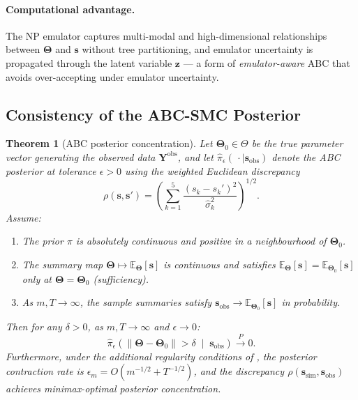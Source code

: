 \documentclass[12pt,a4paper]{article}
\newtheorem{theorem}{Theorem}
\theoremstyle{definition}
\newcommand{\E}{\mathbb{E}}
\newcommand{\bz}{\bm{z}}
\newcommand{\bs}{\bm{s}}
\newcommand{\bTheta}{\bm{\Theta}}
\begin{document}
\paragraph{Computational advantage.}  The NP emulator captures multi-modal
and high-dimensional relationships between $\bTheta$ and $\bs$ without tree
partitioning, and emulator uncertainty is propagated through the latent
variable $\bz$ --- a form of \emph{emulator-aware} ABC that avoids
over-accepting under emulator uncertainty.

\subsection{Consistency of the ABC-SMC Posterior}

\begin{theorem}[ABC posterior concentration]
\label{thm:abc-consistency}
Let $\bTheta_0 \in \Theta$ be the true parameter vector generating the
observed data $\mathbf{Y}^{\mathrm{obs}}$, and let
$\hat{\pi}_\epsilon(\,\cdot\mid\bs_{\mathrm{obs}})$ denote the ABC posterior
at tolerance $\epsilon > 0$ using the weighted Euclidean discrepancy
\begin{equation}
  \rho(\bs, \bs') = \left(\sum_{k=1}^5
    \frac{(s_k - s_k')^2}{\hat{\sigma}_k^2}\right)^{1/2}.
  \label{eq:abc-distance}
\end{equation}
Assume:
\begin{enumerate}[label=(\roman*),noitemsep]
  \item The prior $\pi$ is absolutely continuous and positive in a
        neighbourhood of $\bTheta_0$.
  \item The summary map $\bTheta \mapsto \E_{\bTheta}[\bs]$ is continuous and
        satisfies $\E_{\bTheta}[\bs] = \E_{\bTheta_0}[\bs]$ only at
        $\bTheta = \bTheta_0$ (sufficiency).
  \item As $m, T \to \infty$, the sample summaries satisfy
        $\bs_{\mathrm{obs}} \to \E_{\bTheta_0}[\bs]$ in probability.
\end{enumerate}
Then for any $\delta > 0$, as $m, T \to \infty$ and $\epsilon \to 0$:
\begin{equation}
  \hat{\pi}_\epsilon\!\left(
    \left\|\bTheta - \bTheta_0\right\| > \delta
    \;\middle|\; \bs_{\mathrm{obs}}
  \right) \xrightarrow{\;P\;} 0.
  \label{eq:abc-consistency}
\end{equation}
Furthermore, under the additional regularity conditions of
\citet{legramanti2025}, the posterior contraction rate is
$\epsilon_m = O\!\left(m^{-1/2} + T^{-1/2}\right)$,
and the discrepancy $\rho(\bs_{\mathrm{sim}}, \bs_{\mathrm{obs}})$ achieves
minimax-optimal posterior concentration.
\end{theorem}
\end{document}
